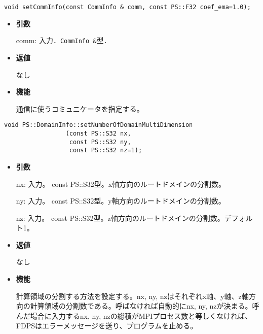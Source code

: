 
\begin{screen}
\begin{verbatim}
void setCommInfo(const CommInfo & comm, const PS::F32 coef_ema=1.0);
\end{verbatim}
\end{screen}

\begin{itemize}

\item {\bf 引数}

comm: 入力．{\tt CommInfo \&}型．


\item {\bf 返値}

なし

\item {\bf 機能}

通信に使うコミュニケータを指定する。 

\end{itemize}



\begin{screen}
\begin{verbatim}
void PS::DomainInfo::setNumberOfDomainMultiDimension
                 (const PS::S32 nx,
                  const PS::S32 ny,
                  const PS::S32 nz=1);
\end{verbatim}
\end{screen}

\begin{itemize}

\item {\bf 引数}

nx: 入力。 const PS::S32型。x軸方向のルートドメインの分割数。

ny: 入力。 const PS::S32型。y軸方向のルートドメインの分割数。

nz: 入力。 const PS::S32型。z軸方向のルートドメインの分割数。デフォル
ト1。

\item {\bf 返値}

なし

\item {\bf 機能}

計算領域の分割する方法を設定する。nx, ny, nzはそれぞれx軸、y軸、z軸方
向の計算領域の分割数である。呼ばなければ自動的にnx, ny, nzが決まる。呼
んだ場合に入力するnx, ny, nzの総積がMPIプロセス数と等しくなければ、
FDPSはエラーメッセージを送り、プログラムを止める。

\end{itemize}

